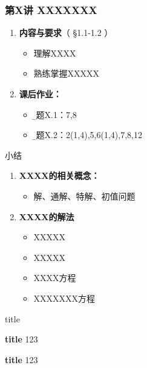 \begin{frame}
	\titlepage
\end{frame}

\begin{frame}
	\frametitle{第X讲 XXXXXXX}
	\linespread{1.5}
	\begin{enumerate}
	  \item {\bf 内容与要求}{\color{blue}（ \S1.1-1.2 ）}
	  \begin{itemize}
	    \item 理解XXXX
	    \item 熟练掌握XXXXX
	  \vspace{1em}
	  \end{itemize}
	  \item {\bf  课后作业：}
	  \begin{itemize}
	    \item {\b 习题X.1：7,8}
	    \item {\b 习题X.2：2(1,4),5,6(1,4),7,8,12}
	  \end{itemize}
	\end{enumerate}
\end{frame}


\begin{frame}[<+->]{小结}
	\linespread{1.5}
	\begin{enumerate}
	  \item {\bf XXXX的相关概念：}
	  \begin{itemize}
	    \item 解、通解、特解、初值问题
	  \end{itemize}
	  \item {\bf XXXX的解法}
	  \begin{itemize}
	    \item XXXXX
	    \item XXXXX
	    \item XXXX方程
	    \item XXXXXXX方程
	  \end{itemize}
	\end{enumerate}
\end{frame}

\begin{frame}{title}
	\linespread{1.2}
	\begin{block}{{\bf title}\hfill}
		123
	\end{block}
	\begin{exampleblock}{{\bf title}\hfill}
		123
	\end{exampleblock}
\end{frame}